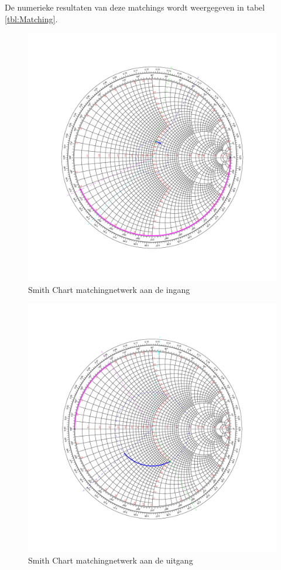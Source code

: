   De numerieke resultaten van deze matchings wordt weergegeven in tabel \ref{tbl:Matching}.

  \begin{figure}
    \centering
    \includegraphics[width=\textwidth,keepaspectratio=true]{fig/matchSource.pdf}
    \caption{Smith Chart matchingnetwerk aan de ingang}
    \label{fig:matchIn}
  \end{figure}

  \begin{figure}
    \centering
    \includegraphics[width=\textwidth,keepaspectratio=true]{fig/matchLoad.pdf}
    \caption{Smith Chart matchingnetwerk aan de uitgang}
    \label{fig:matchOut}
  \end{figure}
  



